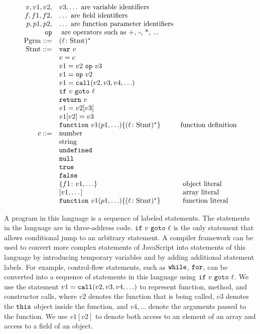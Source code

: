 \documentclass{sig-alternate}
\newcommand \dsl [1] {\ensuremath{{\tt #1}}\xspace}
\begin{document}
{\small
\[
\begin{array}{rll}
v, v1, v2, & v3, \ldots \mbox{ are variable identifiers}\\
f, f1, f2, & \ldots \mbox{ are field identifiers}\\
p, p1, p2, & \ldots \mbox{ are function parameter identifiers}\\
\dsl{op} & \mbox{ are operators such as +, -, *, ...} \\
\mbox{Pgrm} ::= & (\ell\colon \mbox{Stmt})^*\\
\mbox{Stmt} ::= &  \dsl{var}\ v\\
  & v = c\\
  &   v1 = v2\ \dsl{op}\ v3\\
  &   v1 = \dsl{op}\ v2\\
  &   v1 = \dsl{call}(v2, v3, v4, \ldots)\\
  &   \dsl{if}\ v \ \dsl{goto}\ \ell\\
  &   \dsl{return}\ v\\
  &   v1 = v2[v3]\\
  &   v1[v2] = v3\\
  &   \dsl{function}\ v1(p1, \ldots) \{ (\ell\colon \mbox{Stmt})^* \} & \mbox{function definition}\\
c ::= & \mbox{number}\\
  & \mbox{string} \\
  & \dsl{undefined} \\
  & \dsl{null} \\
  & \dsl{true}\\
  & \dsl{false}\\
  & \{f1\colon v1, \ldots\} &\mbox{ object literal}\\
  & [v1, \dots] &\mbox{ array literal}\\
  & \dsl{function}\ v1(p1, \ldots) \{ (\ell\colon \mbox{Stmt})^* \} & \mbox{
    function literal}\\
\end{array}
\]
}

A program in this language is a sequence of labeled statements.  The
statements in the language are in three-address code.  $\dsl{if}\ v\
\dsl{goto}\ \ell$ is the only statement that allows conditional jump
to an arbitrary statement.  A compiler framework can be used to
convert more complex statements of JavaScript into statements of this
language by introducing temporary variables and by adding additional
statement labels.  For example, control-flow statements, such as
\dsl{while}, \dsl{for}, can be converted into a sequence of statements
in this language using $\dsl{if}\ v\ \dsl{goto}\ \ell$.  We use the
statement $v1 = \dsl{call}(v2, v3, v4, \ldots)$ to represent function,
method, and constructor calls, where $v2$ denotes the function that is
being called, $v3$ denotes the \dsl{this} object inside the function,
and $v4, \ldots$ denote the arguments passed to the function.  We use
$v1[v2]$ to denote both access to an element of an array and access to
a field of an object.
\end{document}
